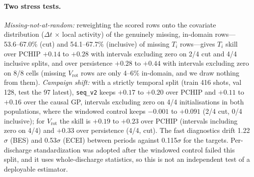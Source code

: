 \documentclass[10pt,twocolumn,letterpaper]{article}
\newcommand{\Ti}{\ensuremath{T_i}}
\newcommand{\Vrot}{\ensuremath{V_\mathrm{rot}}}
\newcommand{\seqv}{\texttt{seq\_v2}}
\begin{document}
\paragraph{Two stress tests.} \emph{Missing-not-at-random:} reweighting the scored
rows onto the covariate distribution ($\Delta t$ $\times$ local activity) of the
genuinely missing, in-domain rows---53.6--67.0\% (cut) and 54.1--67.7\% (inclusive) of
missing \Ti{} rows---gives \Ti{} skill over PCHIP $+0.14$ to $+0.28$ with intervals
excluding zero on 2/4 cut and 4/4 inclusive splits, and over persistence $+0.28$ to
$+0.44$ with intervals excluding zero on 8/8 cells (missing \Vrot{} rows are only
4--6\% in-domain, and we draw nothing from them). \emph{Campaign shift:} with a strictly
temporal split (train 416 shots, val 128, test the 97 latest), \seqv{} keeps $+0.17$
to $+0.20$ over PCHIP and $+0.11$ to $+0.16$ over the causal GP, intervals excluding
zero on 4/4 initialisations in both populations, where the windowed control keeps
$-0.001$ to $+0.091$ (2/4 cut, 0/4 inclusive); for \Vrot{} the skill is $+0.19$ to
$+0.23$ over PCHIP (intervals including zero on 4/4) and $+0.33$ over persistence
(4/4, cut). The fast diagnostics drift 1.22$\sigma$ (BES) and 0.53$\sigma$ (ECEI)
between periods against 0.115$\sigma$ for the targets. Per-discharge standardization
was adopted after the windowed control failed this split, and it uses whole-discharge
statistics, so this is not an independent test of a deployable estimator.
\end{document}
